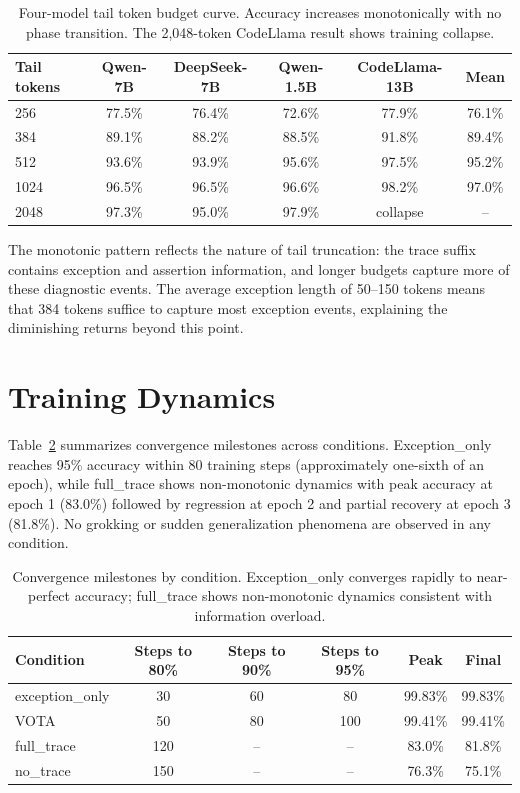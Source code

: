 \documentclass[11pt]{article}
\begin{document}
\begin{table}[h]
\centering
\caption{Four-model tail token budget curve. Accuracy increases monotonically with no phase transition. The 2,048-token CodeLlama result shows training collapse.}
\label{tab:budget}
\begin{tabular}{lccccc}
\toprule
Tail tokens & Qwen-7B & DeepSeek-7B & Qwen-1.5B & CodeLlama-13B & Mean \\
\midrule
256 & 77.5\% & 76.4\% & 72.6\% & 77.9\% & 76.1\% \\
384 & 89.1\% & 88.2\% & 88.5\% & 91.8\% & 89.4\% \\
512 & 93.6\% & 93.9\% & 95.6\% & 97.5\% & 95.2\% \\
1024 & 96.5\% & 96.5\% & 96.6\% & 98.2\% & 97.0\% \\
2048 & 97.3\% & 95.0\% & 97.9\% & collapse & -- \\
\bottomrule
\end{tabular}
\end{table}

The monotonic pattern reflects the nature of tail truncation: the trace suffix contains exception and assertion information, and longer budgets capture more of these diagnostic events. The average exception length of 50--150 tokens means that 384 tokens suffice to capture most exception events, explaining the diminishing returns beyond this point.

\section{Training Dynamics}
\label{app:training}

Table~\ref{tab:convergence} summarizes convergence milestones across conditions. Exception\_only reaches 95\% accuracy within 80 training steps (approximately one-sixth of an epoch), while full\_trace shows non-monotonic dynamics with peak accuracy at epoch 1 (83.0\%) followed by regression at epoch 2 and partial recovery at epoch 3 (81.8\%). No grokking or sudden generalization phenomena are observed in any condition.

\begin{table}[h]
\centering
\caption{Convergence milestones by condition. Exception\_only converges rapidly to near-perfect accuracy; full\_trace shows non-monotonic dynamics consistent with information overload.}
\label{tab:convergence}
\begin{tabular}{lccccc}
\toprule
Condition & Steps to 80\% & Steps to 90\% & Steps to 95\% & Peak & Final \\
\midrule
exception\_only & 30 & 60 & 80 & 99.83\% & 99.83\% \\
VOTA & 50 & 80 & 100 & 99.41\% & 99.41\% \\
full\_trace & 120 & -- & -- & 83.0\% & 81.8\% \\
no\_trace & 150 & -- & -- & 76.3\% & 75.1\% \\
\bottomrule
\end{tabular}
\end{table}
\end{document}
